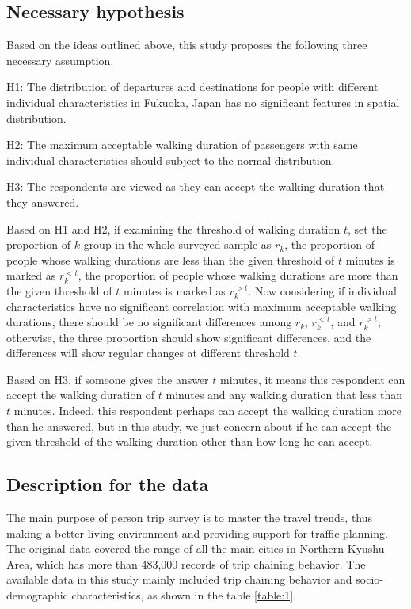 \documentclass[Journal,letterpaper]{ascelike-new}
\begin{document}
%
\subsection{Necessary hypothesis}
Based on the ideas outlined above, this study proposes the following three necessary assumption.

H1: The distribution of departures and destinations for people with different individual characteristics in Fukuoka, Japan has no significant features in spatial distribution. 

H2: The maximum acceptable walking duration of passengers with same individual characteristics should subject to the normal distribution. 

H3: The respondents are viewed as they can accept the walking duration that they answered.

Based on H1 and H2, if examining the threshold of walking duration $t$, set the proportion of $k$ group in the whole surveyed sample as $r_k$, the proportion of people whose walking durations are less than the given threshold of $t$ minutes is marked as $r_{k}^{<t}$, the proportion of people whose walking durations are more than the given threshold of $t$ minutes is marked as $r_{k}^{>t}$. Now considering if individual characteristics have no significant correlation with maximum acceptable walking durations, there should be no significant differences among $r_k$, $r_{k}^{<t}$, and $r_{k}^{>t}$; otherwise, the three proportion should show significant differences, and the differences will show regular changes at different threshold $t$.

Based on H3, if someone gives the answer $t$ minutes, it means this respondent can accept the walking duration of $t$ minutes and any walking duration that less than $t$ minutes. Indeed, this respondent perhaps can accept the walking duration more than he answered, but in this study, we just concern about if he can accept the given threshold of the walking duration other than how long he can accept.

%
\subsection{Description for the data}
The main purpose of person trip survey is to master the travel trends, thus making a better living environment and providing support for traffic planning. The original data covered the range of all the main cities in Northern Kyushu Area, which has more than 483,000 records of trip chaining behavior. The available data in this study mainly included trip chaining behavior and socio-demographic characteristics, as shown in the table \ref{table:1}.
\end{document}
